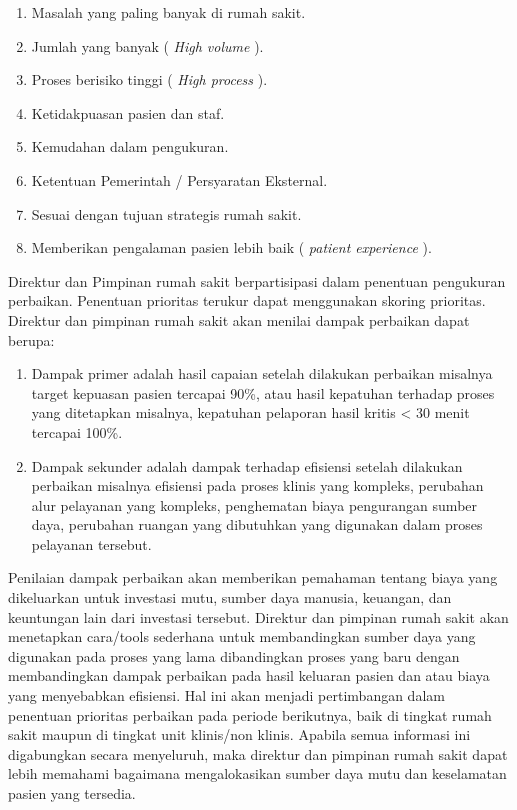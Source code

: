 \documentclass[
]{book}
\providecommand{\tightlist}{%
  \setlength{\itemsep}{0pt}\setlength{\parskip}{0pt}}
\begin{document}
\begin{enumerate}
\def\labelenumi{\alph{enumi}.}
\tightlist
\item
  Masalah yang paling banyak di rumah sakit.
\item
  Jumlah yang banyak ( \emph{High volume} ).
\item
  Proses berisiko tinggi ( \emph{High process} ).
\item
  Ketidakpuasan pasien dan staf.
\item
  Kemudahan dalam pengukuran.
\item
  Ketentuan Pemerintah / Persyaratan Eksternal.
\item
  Sesuai dengan tujuan strategis rumah sakit.
\item
  Memberikan pengalaman pasien lebih baik ( \emph{patient experience} ).
\end{enumerate}

Direktur dan Pimpinan rumah sakit berpartisipasi dalam penentuan pengukuran perbaikan. Penentuan prioritas terukur dapat menggunakan skoring prioritas.
Direktur dan pimpinan rumah sakit akan menilai dampak perbaikan dapat berupa:

\begin{enumerate}
\def\labelenumi{\alph{enumi}.}
\tightlist
\item
  Dampak primer adalah hasil capaian setelah dilakukan perbaikan misalnya target kepuasan pasien tercapai 90\%, atau hasil kepatuhan terhadap proses yang ditetapkan misalnya, kepatuhan pelaporan hasil kritis \textless{} 30 menit tercapai 100\%.
\item
  Dampak sekunder adalah dampak terhadap efisiensi setelah dilakukan perbaikan misalnya efisiensi pada proses klinis yang kompleks, perubahan alur pelayanan yang kompleks, penghematan biaya pengurangan sumber daya, perubahan ruangan yang dibutuhkan yang digunakan dalam proses pelayanan tersebut.
\end{enumerate}

Penilaian dampak perbaikan akan memberikan pemahaman tentang biaya yang dikeluarkan untuk investasi mutu, sumber daya manusia, keuangan, dan keuntungan lain dari investasi tersebut. Direktur dan pimpinan rumah sakit akan menetapkan cara/tools sederhana untuk membandingkan sumber daya yang digunakan pada proses yang lama dibandingkan proses yang baru dengan membandingkan dampak perbaikan pada hasil keluaran pasien dan atau biaya yang menyebabkan efisiensi. Hal ini akan menjadi pertimbangan dalam penentuan prioritas perbaikan pada periode berikutnya, baik di tingkat rumah sakit maupun di tingkat unit klinis/non klinis. Apabila semua informasi ini digabungkan secara menyeluruh, maka direktur dan pimpinan rumah sakit dapat lebih memahami bagaimana mengalokasikan sumber daya mutu dan keselamatan pasien yang tersedia.
\end{document}
